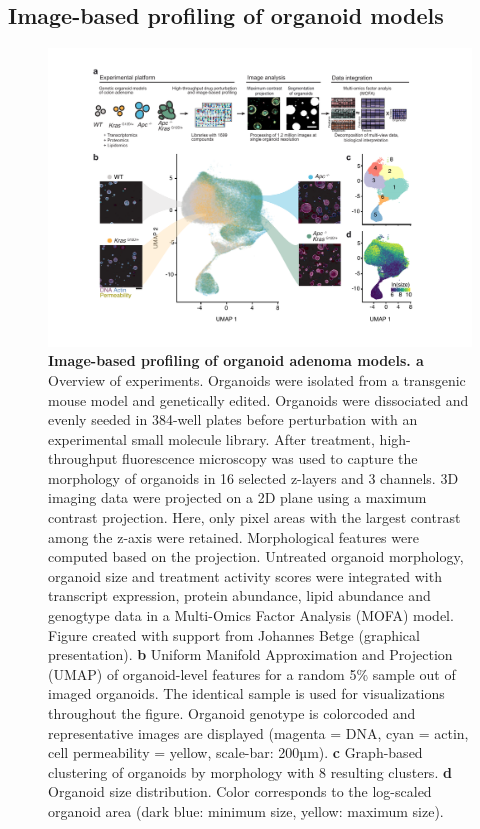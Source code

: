 \begin{flushleft}
\newpage
\section{Image-based profiling of organoid models}

\begin{figure}[h!]
\centering
\includegraphics[width=\textwidth,
                height=\textheight,
                keepaspectratio]{figures/adenomaprofiling/pdf/fig_1_2.pdf}
\caption[Image-based profiling of organoid adenoma models]{\textbf{Image-based profiling of organoid adenoma models. a} Overview of experiments. Organoids were isolated from a transgenic mouse model and genetically edited. Organoids were dissociated and evenly seeded in 384-well plates before perturbation with an experimental small molecule library. After treatment, high-throughput fluorescence microscopy was used to capture the morphology of organoids in 16 selected z-layers and 3 channels. 3D imaging data were projected on a 2D plane using a maximum contrast projection. Here, only pixel areas with the largest contrast among the z-axis were retained. Morphological features were computed based on the projection. Untreated organoid morphology, organoid size and treatment activity scores were integrated with transcript expression, protein abundance, lipid abundance and genogtype data in a Multi-Omics Factor Analysis (MOFA) model. Figure created with support from Johannes Betge (graphical presentation). 
\textbf{b} Uniform Manifold Approximation and Projection (UMAP) of organoid-level features for a random 5\% sample out of imaged organoids. The identical sample is used for visualizations throughout the figure. Organoid genotype is colorcoded and representative images are displayed (magenta = DNA, cyan = actin, cell permeability = yellow, scale-bar: 200µm). \textbf{c} Graph-based clustering of organoids by morphology with 8 resulting clusters. \textbf{d} Organoid size distribution. Color corresponds to the log-scaled organoid area (dark blue: minimum size, yellow: maximum size).}
\label{fig_120}
\end{figure}
\bigbreak


\end{flushleft}

